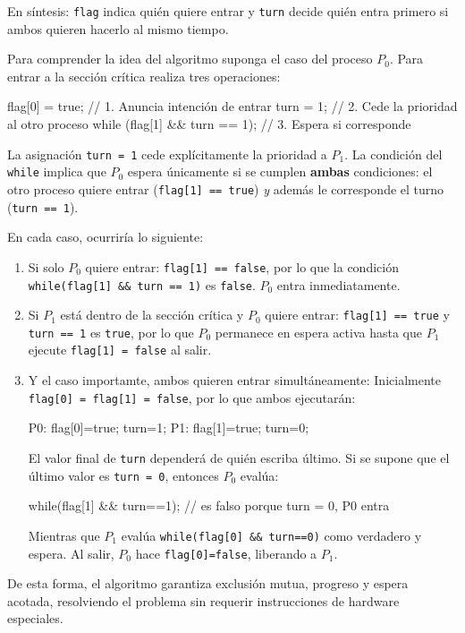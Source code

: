 En síntesis: \texttt{flag} indica quién quiere entrar y \texttt{turn} decide quién entra primero si ambos quieren hacerlo al mismo tiempo.

Para comprender la idea del algoritmo suponga el caso del proceso $P_0$. Para entrar a la sección crítica realiza tres operaciones:
\begin{ccode}[]
flag[0] = true; // 1. Anuncia intención de entrar
turn = 1; // 2. Cede la prioridad al otro proceso
while (flag[1] && turn == 1); // 3. Espera si corresponde
\end{ccode}

La asignación \texttt{turn = 1} cede explícitamente la prioridad a $P_1$. La condición del \texttt{while} implica que $P_0$ espera únicamente si se cumplen \textbf{ambas} condiciones: el otro proceso quiere entrar (\texttt{flag[1] == true}) \textit{y} además le corresponde el turno (\texttt{turn == 1}).

En cada caso, ocurriría lo siguiente:
\begin{enumerate}
    \item Si solo $P_0$ quiere entrar: \texttt{flag[1] == false}, por lo que la condición \texttt{while(flag[1] \&\& turn == 1)} es \texttt{false}. $P_0$ entra inmediatamente.

    \item Si $P_1$ está dentro de la sección crítica y $P_0$ quiere entrar: \texttt{flag[1] == true} y \texttt{turn == 1} es \texttt{true}, por lo que $P_0$ permanece en espera activa hasta que $P_1$ ejecute \texttt{flag[1] = false} al salir.

    \item Y el caso importamte, ambos quieren entrar simultáneamente: Inicialmente \texttt{flag[0] = flag[1] = false}, por lo que ambos ejecutarán:
      \begin{bashcode}
P0: flag[0]=true; turn=1;
P1: flag[1]=true; turn=0;
      \end{bashcode}
  El valor final de \texttt{turn} dependerá de quién escriba último. Si se supone que el último valor es \texttt{turn = 0}, entonces $P_0$ evalúa:
\begin{ccode}
  while(flag[1] && turn==1); // es falso porque turn = 0, P0 entra
\end{ccode}
  Mientras que $P_1$ evalúa \texttt{while(flag[0] \&\& turn==0)} como verdadero y espera. Al salir, $P_0$ hace \texttt{flag[0]=false}, liberando a $P_1$.
\end{enumerate}

De esta forma, el algoritmo garantiza exclusión mutua, progreso y espera acotada, resolviendo el problema sin requerir instrucciones de hardware especiales.


